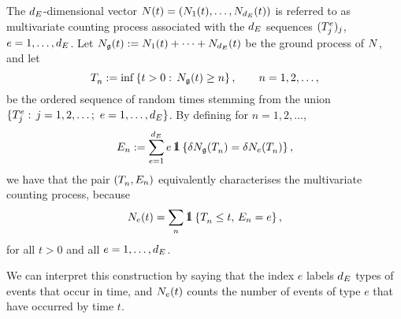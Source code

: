 \documentclass[10pt]{article}
\begin{document}
The $\numEventTypes$-dimensional vector $\multiCountingProc(t) = (\countingProc[1](t), \dots , \countingProc[\numEventTypes](t))$ is referred to as multivariate counting process associated with the $\numEventTypes$ sequences $(\arrivalTimes_{j})_j$, $e=1,\dots, \numEventTypes$. Let $\groundProc(t) := \countingProc[1](t)+ \dots + \countingProc[\numEventTypes](t)$ be the ground process of $\multiCountingProc$, and let 
\begin{equation*}
 \arrivalTimes[ ]_{n} := \inf \left\lbrace t>0: \, \groundProc(t) \geq n\right\rbrace, \qquad n=1,2,\dots, 
\end{equation*}
be the ordered sequence of random times stemming from the union $\lbrace \arrivalTimes_{j}: \, j=1,2,\dots; \,\, e=1,\dots,\numEventTypes\rbrace$. By defining for $n=1,2, \dots$, 
\begin{equation*}
 \event := \sum_{e=1}^{\numEventTypes} e \, \one\left\lbrace \delta \groundProc(\arrivalTimes[ ]_{n}) = \delta\countingProc(\arrivalTimes[ ]_{n}) \right\rbrace,
\end{equation*}
we have that the pair $(\arrivalTimes[ ]_{n}, \event[n])$ equivalently characterises the multivariate counting process, because 
\begin{equation}\label{eq.NTE_counting_proc}
 \countingProc(t) = \sum_{n} \one \left\lbrace \arrivalTimes[ ]_{n}\leq t, \, \event[n] = e\right\rbrace,
\end{equation}
for all $t>0$ and all $e=1,\dots, \numEventTypes$.

We can interpret this construction by saying that the index $e$ labels $\numEventTypes$ types of events that occur in time, and $\countingProc(t)$ counts the number of events of type $e$ that have occurred by time $t$. 
\end{document}
